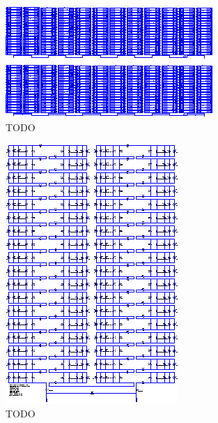 {\begin{a3pages}
    \begin{figure}[h!tb]
        \centering
        \includegraphics[width=\textwidth]{images/ltspice/generic-iv-curves/array.eps}
        \caption{%
            TODO
        }
        \label{fig:ltspice:iv:generic:array}
        \includegraphics[width=\textwidth]{images/ltspice/generic-iv-curves/array-bypass.eps}
        \caption{%
            TODO
        }
        \label{fig:ltspice:iv:generic:array:bypass}
    \end{figure}
\end{a3pages}}

\begin{figure}[h!tb]
    \centering
    \includegraphics[width=\textwidth]{images/ltspice/jac/jacModule.eps}
    \caption{%
        TODO
    }
    \label{fig:ltspice:jac:Module}
\end{figure}
